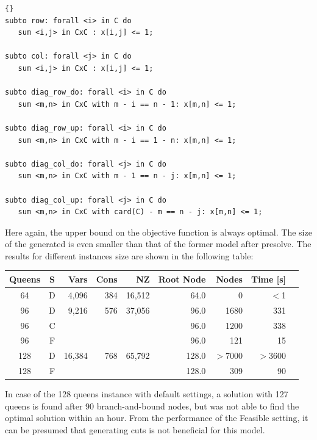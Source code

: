 \medskip
\begin{lstlisting}[frame=tb,firstnumber=13]{}
subto row: forall <i> in C do
   sum <i,j> in CxC : x[i,j] <= 1;

subto col: forall <j> in C do
   sum <i,j> in CxC : x[i,j] <= 1;

subto diag_row_do: forall <i> in C do
   sum <m,n> in CxC with m - i == n - 1: x[m,n] <= 1;

subto diag_row_up: forall <i> in C do
   sum <m,n> in CxC with m - i == 1 - n: x[m,n] <= 1;

subto diag_col_do: forall <j> in C do
   sum <m,n> in CxC with m - 1 == n - j: x[m,n] <= 1;

subto diag_col_up: forall <j> in C do
   sum <m,n> in CxC with card(C) - m == n - j: x[m,n] <= 1;
\end{lstlisting}

\medskip
\noindent Here again, the upper bound on the objective function is always
optimal. The size of the generated \ip is even smaller than that of
the former model after presolve. The results for different instances
size are shown in the following table:
\begin{center}
{\sffamily\small
\begin{tabular}{ccrrrrrrr}
\toprule
Queens & S & Vars & Cons    &   NZ      & Root Node & Nodes & Time [s]\\
\midrule
  64   & D &  4,096 &     384 &    16,512 &  64.0 &     0 & $<$1\\
  96   & D &  9,216 &     576 &    37,056 &  96.0 &  1680 & 331\\
  96   & C &        &         &           &  96.0 &  1200 & 338\\
  96   & F &        &         &           &  96.0 &   121 &  15\\
 128   & D & 16,384 &     768 &    65,792 & 128.0 & $>$7000 &$>$3600 &\\
 128   & F &        &         &           & 128.0 &   309 &  90\\
\bottomrule
\end{tabular}
}
\end{center}
In case of the 128 queens instance with default settings, a solution with 127 queens is found
after 90 branch-and-bound nodes, but \cplex was not able to find the
optimal solution within an hour. From the performance of the Feasible
setting, it can be presumed that generating cuts is not beneficial for
this model.


